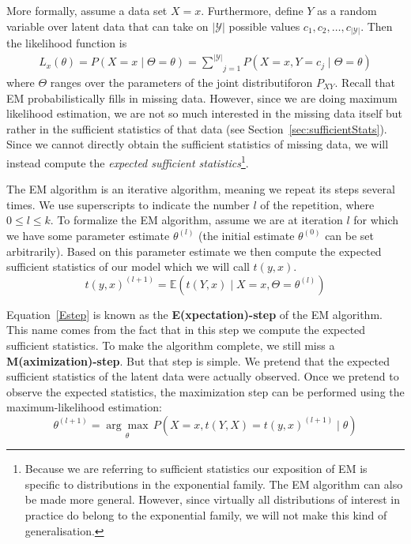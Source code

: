 \documentclass[11pt,leqno,a4paper]{report}\usepackage[]{graphicx}\usepackage[]{color}
\newcommand{\E}{\mathbb{E}}
\newcommand{\philip}[1]{ \textcolor{red}{\textbf{Philip:} #1}}
\newcommand{\chris}[1]{ \textcolor{blue}{\textbf{Chris:} #1}}
\begin{document}
More formally, assume a data set $ X=x $. Furthermore, define $ Y $ as a random variable over latent data that can
take on $ |\mathcal{Y}| $ possible values $c_1, c_2, \ldots, c_{|\mathcal{Y}|}$. Then the likelihood function is 
\begin{align}
L_{x}(\theta) = P(X=x \mid \Theta=\theta) = \underset{j=1}{\overset{|\mathcal{Y}|}{\sum}} P(X=x, Y=c_{j} \mid \Theta=\theta)
\end{align}
where $ \Theta $ ranges over the parameters of the joint distributiforon $ P_{XY} $. Recall that EM
probabilistically fills in missing data. However, since we are doing maximum likelihood estimation, we
are not so much interested in the missing data itself but rather in the sufficient statistics of
that data (see Section~\ref{sec:sufficientStats}). Since we cannot directly obtain the sufficient statistics
of missing data, we will instead compute the \textit{expected sufficient statistics}\footnote{
Because we are referring to sufficient statistics our exposition of EM is specific to distributions
in the exponential family. The EM algorithm can also be made more general. However, since virtually
all distributions of interest in practice do belong to the exponential family, we will not make this kind of generalisation.
}.

The EM algorithm is an iterative 
algorithm, meaning we repeat its steps several
times. We use superscripts to indicate the number $l$ of the repetition, where $ 0 \leq l \leq k $.
To formalize the EM algorithm, assume we are at iteration $l$ for which we have some parameter estimate 
$\theta^{(l)} $ (the initial estimate $\theta^{(0)}$ can be set arbitrarily). Based on this parameter 
estimate we then compute the expected sufficient statistics of our model which we will call $ t(y,x) $.
\begin{equation} \label{Estep}
t(y,x)^{(l+1)} = \E(t(Y,x) \mid X = x,\Theta = \theta^{(l)})
\end{equation} 

Equation~\eqref{Estep} is known as the \textbf{E(xpectation)-step} of the EM algorithm. This name
comes from the fact that in this step we compute the expected sufficient statistics. 
To make the algorithm complete, we still miss a
\textbf{M(aximization)-step}. But that step is simple. We pretend that the expected sufficient statistics of 
the latent data were actually observed. Once we pretend to observe the expected statistics, the maximization 
step can be performed using the maximum-likelihood estimation:
\begin{equation} \label{Mstep}
\theta^{(l+1)} = \underset{\theta}{\arg\max} \, P(X=x, t(Y,X) = t(y,x)^{(l+1)} \mid \theta)
\end{equation}
\end{document}
